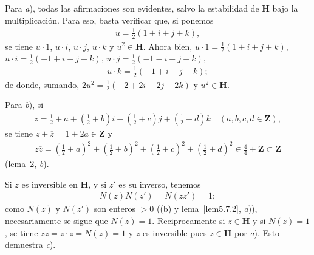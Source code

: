 \documentclass[bibtotoc,leqno,spanish]{amsbook}
\newcommand{\ZZ}{\mathbf{Z}}
\newcommand{\HH}{\mathbf{H}}
\newcommand{\oline}[1]{\overline{#1}}
\numberwithin{equation}{section}
\theoremstyle{note}
\theoremstyle{note}
\theoremstyle{rem}
\numberwithin{theorem}{section}
\numberwithin{proposition}{section}
\numberwithin{definition}{section}
\numberwithin{lemma}{section}
\numberwithin{corollary}{section}
\numberwithin{example}{section}
\numberwithin{footnote}{section}%
\begin{document}
Para {\itshape a}), todas las afirmaciones son evidentes, salvo la estabilidad de $\HH$ bajo la multiplicaci\'on.
Para eso, basta verificar que, si ponemos
\begin{gather*}
u = \frac{1}{2}(1+i+j+k),
\end{gather*}
se tiene $u\cdot 1$, $u\cdot i$, $u\cdot j$, $u\cdot k$ y $u^{2}\in\HH$. Ahora bien,
$u\cdot 1 = \frac{1}{2}(1+i+j+k)$, $u\cdot i = \frac{1}{2}(-1+i+j-k)$, $u\cdot j=\frac{1}{2}(-1-i+j+k)$,
\begin{gather*}
u\cdot k = \frac{1}{2}(-1+i-j+k);
\end{gather*}
de donde, sumando, $2u^{2}=\frac{1}{2}(-2+2i+2j+2k)$ y $u^{2}\in\HH$.

Para {\itshape b}), si
\begin{gather*}
z = \frac{1}{2}+a+\left(\frac{1}{2}+b\right)i+\left(\frac{1}{2}+c\right)j+\left(\frac{1}{2}+d\right)k
\quad(a,b,c,d\in\ZZ),
\end{gather*}
se tiene $z+\oline z = 1+2a\in\ZZ$ y
\begin{gather*}
z\oline z = \left(\frac{1}{2}+a\right)^{2}+\left(\frac{1}{2}+b\right)^{2}+\left(\frac{1}{2}+c\right)^{2}
+\left(\frac{1}{2}+d\right)^{2}\in\frac{4}{4}+\ZZ\subset\ZZ
\end{gather*}
(lema~2, {\itshape b}).

Si $z$ es inversible en $\HH$, y si $z'$ es su inverso, tenemos
\begin{gather*}
N(z)N(z') = N(zz') = 1;
\end{gather*}
como $N(z)$ y $N(z')$ son enteros $>0$ ((b) y
lema~\ref{lem5.7.2}, {\itshape a})), necesariamente se sigue que
$N(z) = 1$. Reciprocamente si $z\in\HH$ y si $N(z) = 1$, se tiene
$z\oline z = \oline z\cdot z = N(z) = 1$
y $z$ es inversible pues $\oline z\in\HH$ por {\itshape a}). Esto demuestra {\itshape c}).
\end{document}
